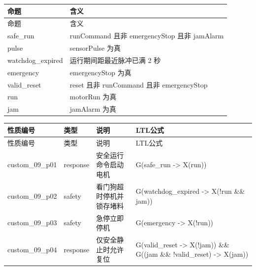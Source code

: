 \begin{longtable}{L{3.3cm}L{10.0cm}}

\toprule

命题 & 含义\\

\midrule

\endfirsthead

\toprule

命题 & 含义\\

\midrule

\endhead

{\ttfamily safe\_run} & runCommand 且非 emergencyStop 且非 jamAlarm\\

{\ttfamily pulse} & sensorPulse 为真\\

{\ttfamily watchdog\_expired} & 运行期间距最近脉冲已满 2 秒\\

{\ttfamily emergency} & emergencyStop 为真\\

{\ttfamily valid\_reset} & reset 且非 runCommand 且非 emergencyStop\\

{\ttfamily run} & motorRun 为真\\

{\ttfamily jam} & jamAlarm 为真\\

\bottomrule

\end{longtable}

\begin{longtable}{L{2.3cm}L{1.7cm}L{4.1cm}L{5.2cm}}

\toprule

性质编号 & 类型 & 说明 & LTL公式\\

\midrule

\endfirsthead

\toprule

性质编号 & 类型 & 说明 & LTL公式\\

\midrule

\endhead

{\ttfamily custom\_09\_p01} & response & 安全运行命令启动电机 & {\ttfamily G(safe\_run -> X(run))}\\

{\ttfamily custom\_09\_p02} & safety & 看门狗超时停机并锁存堵料 & {\ttfamily G(watchdog\_expired -> X(!run \&\& jam))}\\

{\ttfamily custom\_09\_p03} & safety & 急停立即停机 & {\ttfamily G(emergency -> X(!run))}\\

{\ttfamily custom\_09\_p04} & response & 仅安全静止时允许复位 & {\ttfamily G(valid\_reset -> X(!jam)) \&\& G((jam \&\& !valid\_reset) -> X(jam))}\\

\bottomrule

\end{longtable}

